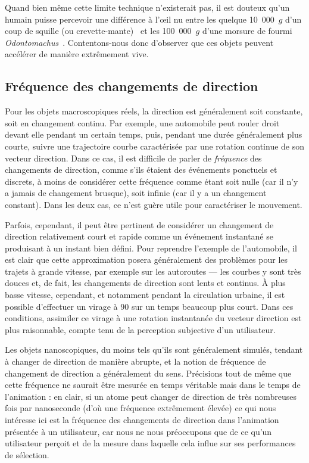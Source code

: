 	
	Quand bien même cette limite technique n'existerait pas, il est douteux qu'un humain puisse percevoir une différence à l'œil nu entre les quelque 10~000~$g$ d'un coup de squille (ou crevette-mante)~\cite{patek2004biomechanics} et les 100~000~$g$ d'une morsure de fourmi \emph{Odontomachus}~\cite{patek2006multifunctionality}. Contentons-nous donc d'observer que ces objets peuvent accélérer de manière extrêmement vive.
   
	\FloatBarrier \subsection{Fréquence des changements de direction}
	Pour les objets macroscopiques réels, la direction est généralement soit constante, soit en changement continu. Par exemple, une automobile peut rouler droit devant elle pendant un certain temps, puis, pendant une durée généralement plus courte, suivre une trajectoire courbe caractérisée par une rotation continue de son vecteur direction. Dans ce cas, il est difficile de parler de \emph{fréquence} des changements de direction, comme s'ils étaient des événements ponctuels et discrets, à moins de considérer cette fréquence comme étant soit nulle (car il n'y a jamais de changement brusque), soit infinie (car il y a un changement constant). Dans les deux cas, ce n'est guère utile pour caractériser le mouvement.
	
	Parfois, cependant, il peut être pertinent de considérer un changement de direction relativement court et rapide comme un événement instantané se produisant à un instant bien défini. Pour reprendre l'exemple de l'automobile, il est clair que cette approximation posera généralement des problèmes pour les trajets à grande vitesse, par exemple sur les autoroutes --- les courbes y sont très douces et, de fait, les changements de direction sont lents et continus. À plus basse vitesse, cependant, et notamment pendant la circulation urbaine, il est possible d'effectuer un virage à 90\textdegree{} sur un temps beaucoup plus court. Dans ces conditions, assimiler ce virage à une rotation instantanée du vecteur direction est plus raisonnable, compte tenu de la perception subjective d'un utilisateur.
	
	Les objets nanoscopiques, du moins tels qu'ils sont généralement simulés, tendant à changer de direction de manière abrupte, et la notion de fréquence de changement de direction a généralement du sens. Précisions tout de même que cette fréquence ne saurait être mesurée en temps véritable mais dans le temps de l'animation : en clair, si un atome peut changer de direction de très nombreuses fois par nanoseconde (d'où une fréquence extrêmement élevée) ce qui nous intéresse ici est la fréquence des changements de direction dans l'animation présentée à un utilisateur, car nous ne nous préoccupons que de ce qu'un utilisateur perçoit et de la mesure dans laquelle cela influe sur ses performances de sélection.
	
